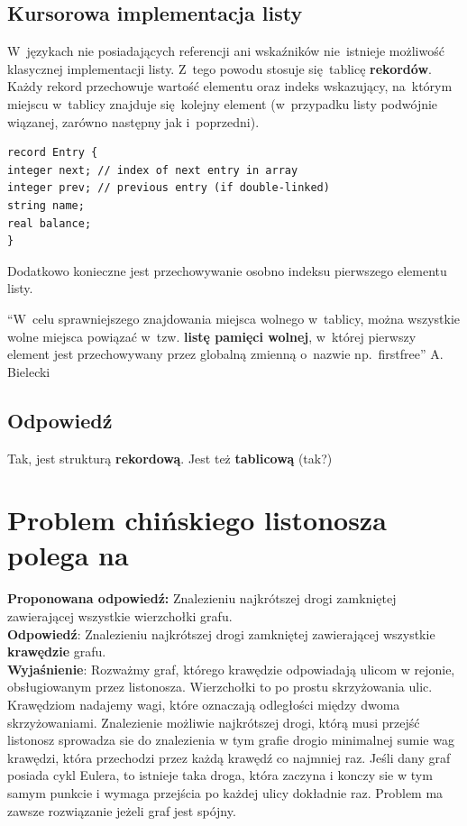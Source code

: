 \subsection{Kursorowa implementacja listy}
W~językach nie posiadających referencji ani wskaźników nie~istnieje możliwość klasycznej implementacji listy. Z~tego powodu stosuje się~tablicę \textbf{rekordów}. Każdy rekord przechowuje wartość elementu oraz indeks wskazujący, na~którym miejscu w~tablicy znajduje się~kolejny element (w~przypadku listy podwójnie wiązanej, zarówno następny jak i~poprzedni).

\begin{lstlisting}
record Entry {
integer next; // index of next entry in array
integer prev; // previous entry (if double-linked)
string name;
real balance;
}
\end{lstlisting}
Dodatkowo konieczne jest przechowywanie osobno indeksu pierwszego elementu listy.

``W~celu sprawniejszego znajdowania miejsca wolnego w~tablicy, można wszystkie wolne miejsca powiązać w~tzw. \textbf{listę pamięci wolnej}, w~której pierwszy element jest przechowywany przez  globalną zmienną o~nazwie np.~firstfree'' A. Bielecki 

\subsection{Odpowiedź}
Tak, jest strukturą \textbf{rekordową}. Jest też \textbf{tablicową} (tak?)

\section{Problem chińskiego listonosza polega na}
\noindent \textbf{Proponowana odpowiedź:} Znalezieniu najkrótszej drogi zamkniętej zawierającej wszystkie wierzchołki grafu. \\

\noindent \textbf{Odpowiedź}:  Znalezieniu najkrótszej drogi zamkniętej zawierającej wszystkie \textbf{krawędzie} grafu. \\

\noindent \textbf{Wyjaśnienie}:
Rozważmy graf, którego krawędzie odpowiadają ulicom w rejonie, obsługiowanym przez listonosza. Wierzchołki to po prostu skrzyżowania ulic. Krawędziom nadajemy wagi, które oznaczają odległości między dwoma skrzyżowaniami. Znalezienie możliwie najkrótszej drogi, którą musi przejść listonosz sprowadza sie do znalezienia w tym grafie drogio minimalnej sumie wag krawędzi, która przechodzi przez każdą krawędź co najmniej raz. Jeśli dany graf posiada cykl Eulera, to istnieje taka droga, która zaczyna i konczy sie w tym samym punkcie i wymaga przejścia po każdej ulicy dokładnie raz. Problem ma zawsze rozwiązanie jeżeli graf jest spójny. 